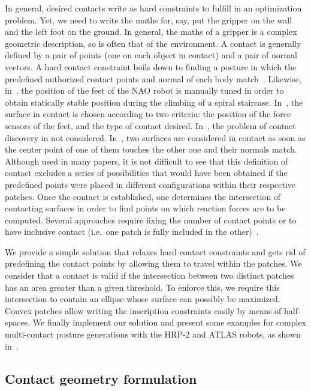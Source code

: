 In general, desired contacts write as hard constraints to fulfill in an optimization problem.
Yet, we need to write the maths for, say, put the gripper on the wall and the left foot on the ground.
In general, the maths of a gripper is a complex geometric description, so is often that of the environment.
A contact is generally defined by a pair of points (one on each object in contact) and a pair of normal vectors.
A hard contact constraint boils down to finding a posture in which the predefined authorized contact points and normal of each body match~\cite{zhang:TePRA:2013}\cite{hauser:IJRR:2008}.
Likewise, in~\cite{osswald:iros:2011}, the position of the feet of the NAO robot is manually tuned in order to obtain statically stable position during the climbing of a spiral staircase.
In~\cite{Chestnutt:2009:BNR:1733023.1733314}, the surface in contact is chosen according to two criteria: the position of the force sensors of the feet, and the type of contact desired.
In~\cite{sentis:itro:2010}, the problem of contact discovery in not considered.
In~\cite{mordatch:acm:2012}, two surfaces are considered in contact as soon as the center point of one of them touches the other one and their normals match.
Although used in many papers, it is not difficult to see that this definition of contact excludes a series of possibilities that would have been obtained if the predefined points were placed in different configurations within their respective patches.
Once the contact is established, one determines the intersection of contacting surfaces in order to find points on which reaction forces are to be computed.
Several approaches require fixing the number of contact points or to have inclusive contact (i.e.\ one patch is fully included in the other)~\cite{bouyarmane:ar:2012}.

We provide a simple solution that relaxes hard contact constraints and gets rid of predefining the contact points by allowing them to travel within the patches.
We consider that a contact is valid if the intersection between two distinct patches has an area greater than a given threshold.
To enforce this, we require this intersection to contain an ellipse whose surface can possibly be maximized.
Convex patches allow writing the inscription constraints easily by means of half-spaces.
We finally implement our solution and present some examples for complex multi-contact posture generations with the HRP-2 and ATLAS robots, as shown in~.


\subsection{Contact geometry formulation}
\label{subsec:contact_geometry_formulation}

